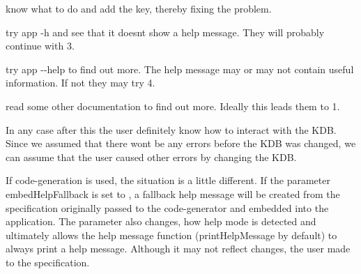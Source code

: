 \begin{DoxyEnumerate}
\item know what to do and add the key, thereby fixing the problem.
\item try {\ttfamily app -\/h} and see that it doesn\textquotesingle{}t show a help message. They will probably continue with 3.
\item try {\ttfamily app -\/-\/help} to find out more. The help message may or may not contain useful information. If not they may try 4.
\item read some other documentation to find out more. Ideally this leads them to 1.
\end{DoxyEnumerate}

In any case after this the user definitely know how to interact with the K\+DB. Since we assumed that there won\textquotesingle{}t be any errors before the K\+DB was changed, we can assume that the user caused other errors by changing the K\+DB.

If code-\/generation is used, the situation is a little different. If the parameter {\ttfamily embed\+Help\+Fallback} is set to {}, a fallback help message will be created from the specification originally passed to the code-\/generator and embedded into the application. The parameter also changes, how help mode is detected and ultimately allows the help message function ({\ttfamily print\+Help\+Message} by default) to always print a help message. Although it may not reflect changes, the user made to the specification. 